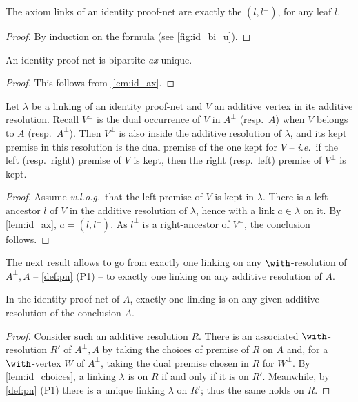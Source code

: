 \documentclass{lmcs}
\newcommand*{\orth}{^\perp} %
\newcommand*{\ie}{\emph{i.e.}}
\newcommand*{\wolog}{\emph{w.l.o.g.}}
\newcommand*{\resp}{resp.}
\newcommand*{\unique}{\textit{ax}-unique}
\begin{document}
\begin{lem}
\label{lem:id_ax}
The axiom links of an identity proof-net are exactly the $(l,l\orth)$, for any leaf $l$.
\end{lem}
\begin{proof}
By induction on the formula (see \autoref{fig:id_bi_u}).
\end{proof}

\begin{cor}
\label{cor:id_bi_u}
An identity proof-net is bipartite \unique.
\end{cor}
\begin{proof}
This follows from \autoref{lem:id_ax}.
\end{proof}

\begin{lem}
\label{lem:id_choices}
Let $\lambda$ be a linking of an identity proof-net and $V$ an additive vertex in its additive resolution.
Recall $V\orth$ is the dual occurrence of $V$ in $A\orth$ (\resp\ $A$) when $V$ belongs to $A$ (\resp\ $A\orth$).
Then $V\orth$ is also inside the additive resolution of $\lambda$, and its kept premise in this resolution is the dual premise of the one kept for $V$ -- \ie\ if the left (\resp\ right) premise of $V$ is kept, then the right (\resp\ left) premise of $V\orth$ is kept.
\end{lem}
\begin{proof}
Assume \wolog\ that the left premise of $V$ is kept in $\lambda$.
There is a left-ancestor $l$ of $V$ in the additive resolution of $\lambda$, hence with a link $a\in\lambda$ on it.
By \autoref{lem:id_ax}, $a=(l,l\orth)$.
As $l\orth$ is a right-ancestor of $V\orth$, the conclusion follows.
\end{proof}

The next result allows to go from exactly one linking on any $\with$-resolution of $A\orth, A$ -- \autoref{def:pn} (P1) -- to exactly one linking on any additive resolution of $A$.

\begin{lem}
\label{lem:id_res}
In the identity proof-net of $A$, exactly one linking is on any given additive resolution of the conclusion $A$.
\end{lem}
\begin{proof}
Consider such an additive resolution $R$. There is an associated $\with$-resolution $R'$ of $A\orth,A$ by taking the choices of premise of $R$ on $A$ and, for a $\with$-vertex $W$ of $A\orth$, taking the dual premise chosen in $R$ for $W\orth$.
By \autoref{lem:id_choices}, a linking $\lambda$ is on $R$ if and only if it is on $R'$.
Meanwhile, by \autoref{def:pn} (P1) there is a unique linking $\lambda$ on $R'$; thus the same holds on $R$.
\end{proof}
\end{document}

